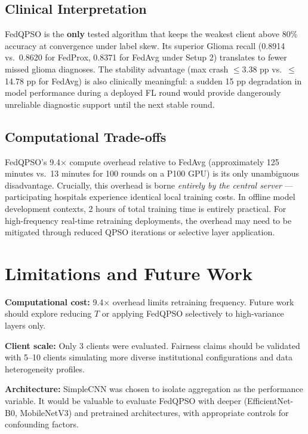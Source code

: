 \documentclass[conference]{IEEEtran}
\begin{document}
\subsection{Clinical Interpretation}
FedQPSO is the \textbf{only} tested algorithm that keeps the weakest client
above 80\% accuracy at convergence under label skew. Its superior Glioma
recall (0.8914 vs.\ 0.8620 for FedProx, 0.8371 for FedAvg under Setup 2)
translates to fewer missed glioma diagnoses. The stability advantage (max
crash $\leq$3.38 pp vs.\ $\leq$14.78 pp for FedAvg) is also clinically
meaningful: a sudden 15 pp degradation in model performance during a deployed
FL round would provide dangerously unreliable diagnostic support until the
next stable round.

\subsection{Computational Trade-offs}
FedQPSO's 9.4$\times$ compute overhead relative to FedAvg (approximately 125
minutes vs.\ 13 minutes for 100 rounds on a P100 GPU) is its only
unambiguous disadvantage. Crucially, this overhead is borne \emph{entirely by
the central server} --- participating hospitals experience identical local
training costs. In offline model development contexts, 2 hours of total
training time is entirely practical. For high-frequency real-time retraining
deployments, the overhead may need to be mitigated through reduced QPSO
iterations or selective layer application.

\section{Limitations and Future Work}
\label{sec:limitations}

\textbf{Computational cost:} 9.4$\times$ overhead limits retraining frequency.
Future work should explore reducing $T$ or applying FedQPSO selectively to
high-variance layers only.

\textbf{Client scale:} Only 3 clients were evaluated. Fairness claims should
be validated with 5--10 clients simulating more diverse institutional
configurations and data heterogeneity profiles.

\textbf{Architecture:} SimpleCNN was chosen to isolate aggregation as the
performance variable. It would be valuable to evaluate FedQPSO with deeper
(EfficientNet-B0, MobileNetV3) and pretrained architectures, with appropriate
controls for confounding factors.
\end{document}
